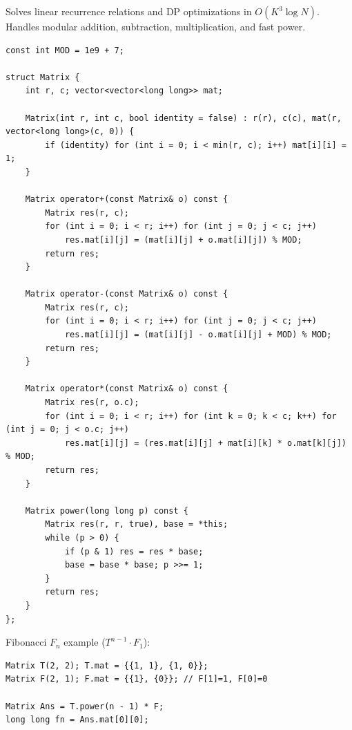 
Solves linear recurrence relations and DP optimizations in $O(K^3 \log N)$. Handles modular addition, subtraction, multiplication, and fast power.

\begin{lstlisting}
const int MOD = 1e9 + 7;

struct Matrix {
    int r, c; vector<vector<long long>> mat;
    
    Matrix(int r, int c, bool identity = false) : r(r), c(c), mat(r, vector<long long>(c, 0)) {
        if (identity) for (int i = 0; i < min(r, c); i++) mat[i][i] = 1;
    }
    
    Matrix operator+(const Matrix& o) const {
        Matrix res(r, c);
        for (int i = 0; i < r; i++) for (int j = 0; j < c; j++)
            res.mat[i][j] = (mat[i][j] + o.mat[i][j]) % MOD;
        return res;
    }

    Matrix operator-(const Matrix& o) const {
        Matrix res(r, c);
        for (int i = 0; i < r; i++) for (int j = 0; j < c; j++)
            res.mat[i][j] = (mat[i][j] - o.mat[i][j] + MOD) % MOD;
        return res;
    }

    Matrix operator*(const Matrix& o) const {
        Matrix res(r, o.c);
        for (int i = 0; i < r; i++) for (int k = 0; k < c; k++) for (int j = 0; j < o.c; j++)
            res.mat[i][j] = (res.mat[i][j] + mat[i][k] * o.mat[k][j]) % MOD;
        return res;
    }

    Matrix power(long long p) const {
        Matrix res(r, r, true), base = *this;
        while (p > 0) {
            if (p & 1) res = res * base;
            base = base * base; p >>= 1;
        }
        return res;
    }
};
\end{lstlisting}

Fibonacci $F_n$ example ($T^{n-1} \cdot F_1$):
\begin{lstlisting}
Matrix T(2, 2); T.mat = {{1, 1}, {1, 0}};
Matrix F(2, 1); F.mat = {{1}, {0}}; // F[1]=1, F[0]=0

Matrix Ans = T.power(n - 1) * F;
long long fn = Ans.mat[0][0];
\end{lstlisting}
